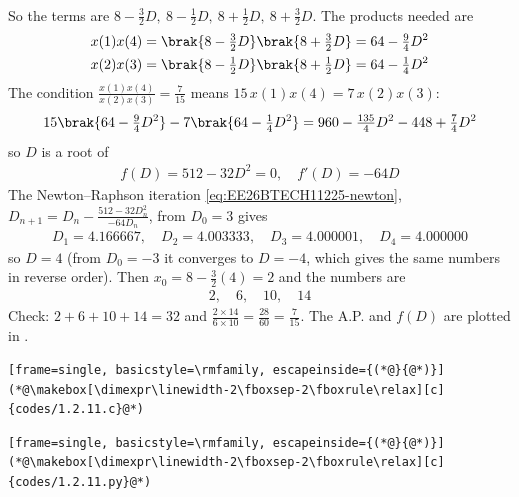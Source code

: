 \begin{enumerate}[label=\thesubsection.\arabic*, ref=\thesubsection.\theenumi]
\begin{align}
\end{align}
So the terms are $8 - \frac{3}{2}D, \ 8 - \frac{1}{2}D, \ 8 + \frac{1}{2}D, \ 8 + \frac{3}{2}D$. The products needed are
\begin{align*}
x(1)x(4) &= \brak{8 - \tfrac{3}{2}D}\brak{8 + \tfrac{3}{2}D} = 64 - \tfrac{9}{4}D^2 \\
x(2)x(3) &= \brak{8 - \tfrac{1}{2}D}\brak{8 + \tfrac{1}{2}D} = 64 - \tfrac{1}{4}D^2
\end{align*}
The condition $\frac{x(1)x(4)}{x(2)x(3)} = \frac{7}{15}$ means $15\,x(1)x(4) = 7\,x(2)x(3)$:
\begin{align*}
15\brak{64 - \tfrac{9}{4}D^2} - 7\brak{64 - \tfrac{1}{4}D^2} = 960 - \tfrac{135}{4}D^2 - 448 + \tfrac{7}{4}D^2
\end{align*}
so $D$ is a root of
\begin{align}
f(D) = 512 - 32D^2 = 0, \quad f'(D) = -64D
\end{align}
The Newton--Raphson iteration \eqref{eq:EE26BTECH11225-newton}, $D_{n+1} = D_n - \frac{512 - 32D_n^2}{-64D_n}$, from $D_0 = 3$ gives
\begin{align*}
D_1 = 4.166667, \quad D_2 = 4.003333, \quad D_3 = 4.000001, \quad D_4 = 4.000000
\end{align*}
so $D = 4$ (from $D_0 = -3$ it converges to $D = -4$, which gives the same numbers in reverse order). Then $x_0 = 8 - \frac{3}{2}(4) = 2$ and the numbers are
\begin{align}
\boxed{2, \quad 6, \quad 10, \quad 14}
\end{align}
Check: $2 + 6 + 10 + 14 = 32$ and $\frac{2 \times 14}{6 \times 10} = \frac{28}{60} = \frac{7}{15}$. The A.P. and $f(D)$ are plotted in .
\begin{lstlisting}[frame=single, basicstyle=\rmfamily, escapeinside={(*@}{@*)}]
(*@\makebox[\dimexpr\linewidth-2\fboxsep-2\fboxrule\relax][c]{codes/1.2.11.c}@*)
\end{lstlisting}
\begin{lstlisting}[frame=single, basicstyle=\rmfamily, escapeinside={(*@}{@*)}]
(*@\makebox[\dimexpr\linewidth-2\fboxsep-2\fboxrule\relax][c]{codes/1.2.11.py}@*)
\end{lstlisting}
\begin{figure}[H]

\end{figure}
\end{enumerate}
